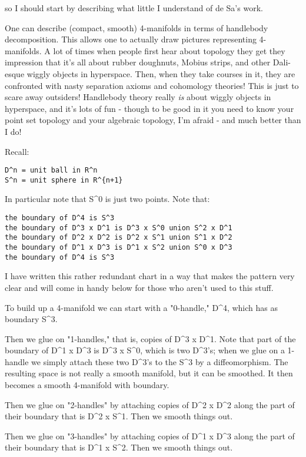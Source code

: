so I should start by describing what little I understand of de Sa's
work.  

One can describe (compact, smooth) 4-manifolds in terms of
handlebody decomposition.  This allows one to actually draw pictures
representing 4-manifolds.  A lot of times when people first hear about
topology they get they impression that it's all about rubber doughnuts,
Mobius strips, and other Dali-esque wiggly objects in hyperspace.  Then,
when they take courses in it, they are confronted with nasty separation
axioms and cohomology theories!  This is just to scare away outsiders!
Handlebody theory really \emph{is} about wiggly objects in hyperspace, and
it's lots of fun  - though to be good in it you need to know your point
set topology and your algebraic topology, I'm afraid - and much better
than I do!  

Recall:

\begin{verbatim}
D^n = unit ball in R^n
S^n = unit sphere in R^{n+1}
\end{verbatim}
    

In particular note that S^0 is just two points.  Note that:

\begin{verbatim}
the boundary of D^4 is S^3
the boundary of D^3 x D^1 is D^3 x S^0 union S^2 x D^1
the boundary of D^2 x D^2 is D^2 x S^1 union S^1 x D^2
the boundary of D^1 x D^3 is D^1 x S^2 union S^0 x D^3
the boundary of D^4 is S^3
\end{verbatim}
    

I have written this rather redundant chart in a way that makes the
pattern very clear and will come in handy below for those who aren't
used to this stuff.

To build up a 4-manifold we can start with a "0-handle," D^4, which has
as boundary S^3.  

Then we glue on "1-handles," that is, copies of D^3 x D^1.  
Note that part of the boundary of D^1 x D^3 is D^3 x S^0, which is two
D^3's; when we glue on a 1-handle we simply attach these two D^3's to
the S^3 by a diffeomorphism.  The resulting space is not really a smooth
manifold, but it can be smoothed.  It then becomes a smooth 4-manifold
with boundary.

Then we glue on "2-handles" by attaching copies of D^2 x D^2 along the
part of their boundary that is D^2 x S^1.  Then we smooth things out.

Then we glue on "3-handles" by attaching copies of D^1 x D^3 along the
part of their boundary that is D^1 x S^2.  Then we smooth things out.

